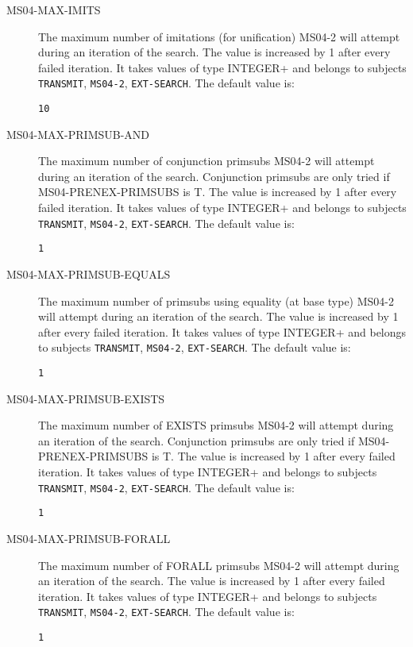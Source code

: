 \begin{description}
\item[MS04-MAX-IMITS]  
The maximum number of imitations (for unification) MS04-2 will attempt during an iteration of the search.
The value is increased by 1 after every failed iteration.
It takes values of type INTEGER+ and belongs to subjects \texttt{TRANSMIT}, \texttt{MS04-2}, \texttt{EXT-SEARCH}.  The default value is: \begin{lstlisting}
10
\end{lstlisting}

\item[MS04-MAX-PRIMSUB-AND]  
The maximum number of conjunction primsubs MS04-2 will attempt during an iteration of the search.
Conjunction primsubs are only tried if MS04-PRENEX-PRIMSUBS is T.
The value is increased by 1 after every failed iteration.
It takes values of type INTEGER+ and belongs to subjects \texttt{TRANSMIT}, \texttt{MS04-2}, \texttt{EXT-SEARCH}.  The default value is: \begin{lstlisting}
1
\end{lstlisting}

\item[MS04-MAX-PRIMSUB-EQUALS]  
The maximum number of primsubs using equality (at base type) MS04-2 will attempt during an iteration of the search.
The value is increased by 1 after every failed iteration.
It takes values of type INTEGER+ and belongs to subjects \texttt{TRANSMIT}, \texttt{MS04-2}, \texttt{EXT-SEARCH}.  The default value is: \begin{lstlisting}
1
\end{lstlisting}

\item[MS04-MAX-PRIMSUB-EXISTS]  
The maximum number of EXISTS primsubs MS04-2 will attempt during an iteration of the search.
Conjunction primsubs are only tried if MS04-PRENEX-PRIMSUBS is T.
The value is increased by 1 after every failed iteration.
It takes values of type INTEGER+ and belongs to subjects \texttt{TRANSMIT}, \texttt{MS04-2}, \texttt{EXT-SEARCH}.  The default value is: \begin{lstlisting}
1
\end{lstlisting}

\item[MS04-MAX-PRIMSUB-FORALL]  
The maximum number of FORALL primsubs MS04-2 will attempt during an iteration of the search.
The value is increased by 1 after every failed iteration.
It takes values of type INTEGER+ and belongs to subjects \texttt{TRANSMIT}, \texttt{MS04-2}, \texttt{EXT-SEARCH}.  The default value is: \begin{lstlisting}
1
\end{lstlisting}


\end{description}
